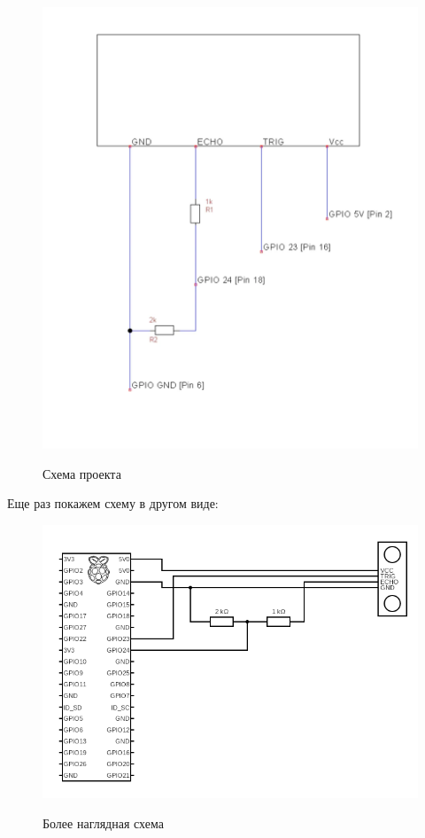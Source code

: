 \documentclass[a4paper, 14pt]{article}
\begin{document}
\begin{figure}[H]
	\centering
	\includegraphics[width=12cm]{screenshots/3.png}\\
	\caption{Схема проекта}
\end{figure}

Еще раз покажем схему в другом виде:

\begin{figure}[H]
	\centering
	\includegraphics[width=12cm]{screenshots/5.png}\\
	\caption{Более наглядная схема}
\end{figure}
\end{document}
